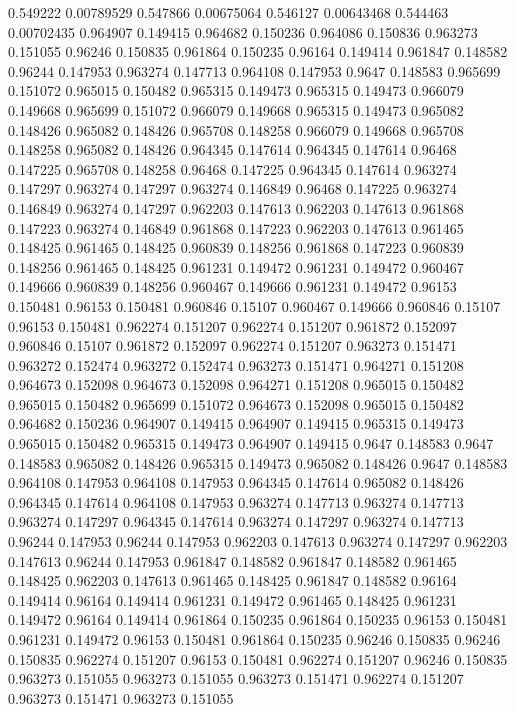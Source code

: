 0.549222 0.00789529
0.547866 0.00675064
0.546127 0.00643468
0.544463 0.00702435
0.964907 0.149415
0.964682 0.150236
0.964086 0.150836
0.963273 0.151055
0.96246 0.150835
0.961864 0.150235
0.96164 0.149414
0.961847 0.148582
0.96244 0.147953
0.963274 0.147713
0.964108 0.147953
0.9647 0.148583
0.965699 0.151072
0.965015 0.150482
0.965315 0.149473
0.965315 0.149473
0.966079 0.149668
0.965699 0.151072
0.966079 0.149668
0.965315 0.149473
0.965082 0.148426
0.965082 0.148426
0.965708 0.148258
0.966079 0.149668
0.965708 0.148258
0.965082 0.148426
0.964345 0.147614
0.964345 0.147614
0.96468 0.147225
0.965708 0.148258
0.96468 0.147225
0.964345 0.147614
0.963274 0.147297
0.963274 0.147297
0.963274 0.146849
0.96468 0.147225
0.963274 0.146849
0.963274 0.147297
0.962203 0.147613
0.962203 0.147613
0.961868 0.147223
0.963274 0.146849
0.961868 0.147223
0.962203 0.147613
0.961465 0.148425
0.961465 0.148425
0.960839 0.148256
0.961868 0.147223
0.960839 0.148256
0.961465 0.148425
0.961231 0.149472
0.961231 0.149472
0.960467 0.149666
0.960839 0.148256
0.960467 0.149666
0.961231 0.149472
0.96153 0.150481
0.96153 0.150481
0.960846 0.15107
0.960467 0.149666
0.960846 0.15107
0.96153 0.150481
0.962274 0.151207
0.962274 0.151207
0.961872 0.152097
0.960846 0.15107
0.961872 0.152097
0.962274 0.151207
0.963273 0.151471
0.963272 0.152474
0.963272 0.152474
0.963273 0.151471
0.964271 0.151208
0.964673 0.152098
0.964673 0.152098
0.964271 0.151208
0.965015 0.150482
0.965015 0.150482
0.965699 0.151072
0.964673 0.152098
0.965015 0.150482
0.964682 0.150236
0.964907 0.149415
0.964907 0.149415
0.965315 0.149473
0.965015 0.150482
0.965315 0.149473
0.964907 0.149415
0.9647 0.148583
0.9647 0.148583
0.965082 0.148426
0.965315 0.149473
0.965082 0.148426
0.9647 0.148583
0.964108 0.147953
0.964108 0.147953
0.964345 0.147614
0.965082 0.148426
0.964345 0.147614
0.964108 0.147953
0.963274 0.147713
0.963274 0.147713
0.963274 0.147297
0.964345 0.147614
0.963274 0.147297
0.963274 0.147713
0.96244 0.147953
0.96244 0.147953
0.962203 0.147613
0.963274 0.147297
0.962203 0.147613
0.96244 0.147953
0.961847 0.148582
0.961847 0.148582
0.961465 0.148425
0.962203 0.147613
0.961465 0.148425
0.961847 0.148582
0.96164 0.149414
0.96164 0.149414
0.961231 0.149472
0.961465 0.148425
0.961231 0.149472
0.96164 0.149414
0.961864 0.150235
0.961864 0.150235
0.96153 0.150481
0.961231 0.149472
0.96153 0.150481
0.961864 0.150235
0.96246 0.150835
0.96246 0.150835
0.962274 0.151207
0.96153 0.150481
0.962274 0.151207
0.96246 0.150835
0.963273 0.151055
0.963273 0.151055
0.963273 0.151471
0.962274 0.151207
0.963273 0.151471
0.963273 0.151055
